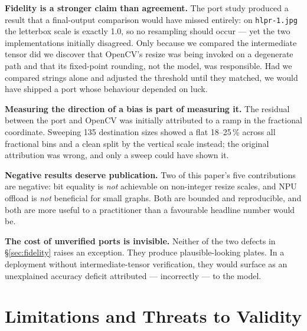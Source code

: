\documentclass[journal]{IEEEtran}
\begin{document}
\textbf{Fidelity is a stronger claim than agreement.} The port study produced a
result that a final-output comparison would have missed entirely: on
\texttt{hlpr-1.jpg} the letterbox scale is exactly 1.0, so no resampling should
occur --- yet the two implementations initially disagreed. Only because we
compared the intermediate tensor did we discover that OpenCV's resize was being
invoked on a degenerate path and that its fixed-point rounding, not the model,
was responsible. Had we compared strings alone and adjusted the threshold until
they matched, we would have shipped a port whose behaviour depended on luck.

\textbf{Measuring the direction of a bias is part of measuring it.} The
residual between the port and OpenCV was initially attributed to a ramp in the
fractional coordinate. Sweeping 135 destination sizes showed a flat 18--25\,\%
across all fractional bins and a clean split by the vertical scale instead; the
original attribution was wrong, and only a sweep could have shown it.

\textbf{Negative results deserve publication.} Two of this paper's five
contributions are negative: bit equality is \emph{not} achievable on non-integer
resize scales, and NPU offload is \emph{not} beneficial for small graphs. Both
are bounded and reproducible, and both are more useful to a practitioner than a
favourable headline number would be.

\textbf{The cost of unverified ports is invisible.} Neither of the two defects in
\S\ref{sec:fidelity} raises an exception. They produce plausible-looking plates.
In a deployment without intermediate-tensor verification, they would surface as
an unexplained accuracy deficit attributed --- incorrectly --- to the model.

\section{Limitations and Threats to Validity}
\end{document}
